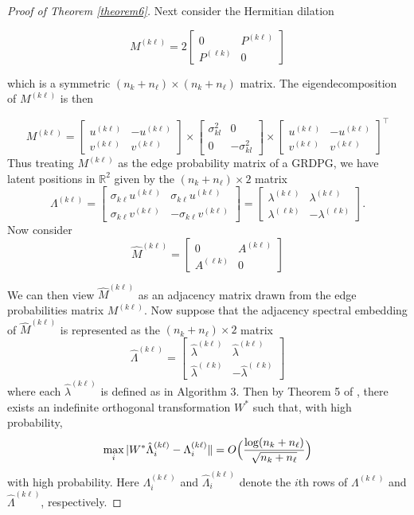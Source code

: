 \documentclass[12pt]{article}
\begin{document}
\begin{proof}[Proof of Theorem \ref{theorem6}]
Next consider the Hermitian dilation

\[M^{(k \ell)} = 2 \begin{bmatrix} 0 & P^{(k \ell)} \\ P^{(\ell k)} & 0 \end{bmatrix}\]

which is a symmetric \((n_k + n_\ell) \times (n_k + n_\ell)\) matrix. The
eigendecomposition of \(M^{(k \ell)}\) is then

\[M^{(k \ell)} = 
\begin{bmatrix} u^{(k \ell)} & -u^{(k \ell)} \\ v^{(k \ell)} & v^{(k \ell)} \end{bmatrix} \times 
\begin{bmatrix} \sigma^2_{kl} & 0 \\ 0 & -\sigma^2_{kl} \end{bmatrix} \times
\begin{bmatrix} u^{(k \ell)} & -u^{(k \ell)} \\ v^{(k \ell)} & v^{(k \ell)} \end{bmatrix}^\top\]
Thus treating \(M^{(k \ell)}\) as the edge probability matrix of a GRDPG, we
have latent positions in \(\mathbb{R}^2\) given by the $(n_k + n_{\ell}) \times 2$ matrix
\[\Lambda^{(k \ell)} = \begin{bmatrix} 
  \sigma_{k \ell} u^{(k \ell)} & \sigma_{k \ell} u^{(k \ell)} \\ 
  \sigma_{k \ell} v^{(k \ell)} & -\sigma_{k \ell} v^{(k \ell)} 
\end{bmatrix} = 
\begin{bmatrix} 
  \lambda^{(k \ell)} & \lambda^{(k \ell)} \\ 
  \lambda^{( \ell k)} & -\lambda^{( \ell k)} 
\end{bmatrix}.\]
Now consider
\[\hat{M}^{(k \ell)} = \begin{bmatrix} 0 & A^{(k \ell)} \\ A^{(\ell k)} & 0 \end{bmatrix}\]

We can then view \(\hat{M}^{(k \ell)}\) as an adjacency matrix drawn from
the edge probabilities matrix \(M^{(k \ell)}\). Now suppose that the adjacency spectral
embedding of $\hat{M}^{(k \ell)}$ is represented as the $(n_k +
n_{\ell}) \times 2$ matrix
\[\hat{\Lambda}^{(k \ell)} = \begin{bmatrix} 
  \hat{\lambda}^{(k \ell)} & \hat{\lambda}^{(k \ell)} \\ 
  \hat{\lambda}^{(\ell k)} & -\hat{\lambda}^{(\ell k)} 
\end{bmatrix}\]
where each \(\hat{\lambda}^{(k \ell)}\) is defined as in Algorithm 3. Then
by Theorem 5 of \citet{rubindelanchy2017statistical}, there
exists an indefinite orthogonal transformation $W^{*}$ such that,  with
high probability,
$$\max_{i} |W^{*} \hat{\Lambda}_{i}^{(k \ell)} - \Lambda_{i}^{(k \ell)} \| =
O\Bigl(\frac{\log (n_k + n_{\ell})}{\sqrt{n_k + n_{\ell}}}\Bigr)$$
with high probability. Here $\Lambda_{i}^{(k \ell)}$ and
$\hat{\Lambda}_i^{(k \ell)}$ denote the $i$th rows of $\Lambda^{(k
  \ell)}$ and $\hat{\Lambda}^{(k \ell)}$, respectively. 


\end{proof}
\end{document}
